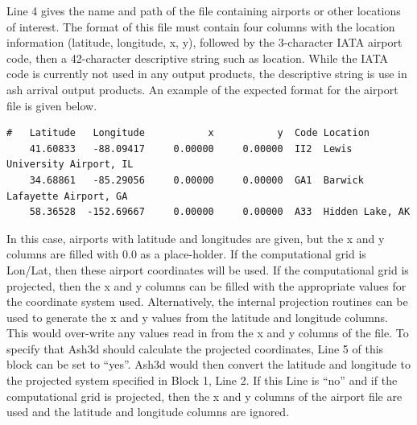 Line 4 gives the name and path of the file containing airports or other locations
of interest. The format of this file must contain four columns with the location
information (latitude, longitude, x, y), followed by the 3-character IATA airport
code, then a 42-character descriptive string such as location. While the IATA
code is currently not used in any output products, the descriptive
string is use in ash arrival output products. An example of the expected format
for the airport file is given below.
\small
\begin{verbatim}
#   Latitude   Longitude           x           y  Code Location
    41.60833   -88.09417     0.00000     0.00000  II2  Lewis University Airport, IL
    34.68861   -85.29056     0.00000     0.00000  GA1  Barwick Lafayette Airport, GA
    58.36528  -152.69667     0.00000     0.00000  A33  Hidden Lake, AK
\end{verbatim}
\normalsize
In this case, airports with latitude and longitudes are given, but the x and y
columns are filled with 0.0 as a place-holder. If the computational grid is
Lon/Lat, then these airport coordinates will be used. If the computational 
grid is projected, then the x and y columns can be filled with the appropriate
values for the coordinate system used. Alternatively, the internal projection routines
can be used to generate the x and y values from the latitude and longitude columns.
This would over-write any values read in from the x and y columns of the file.
To specify that Ash3d should calculate the projected coordinates, Line 5 of
this block can be set to ``yes''. Ash3d would then convert the latitude and longitude
to the projected system specified in Block 1, Line 2. If this Line is ``no'' and 
if the computational grid is projected, then the x and y columns of the airport
file are used and the latitude and longitude columns are ignored.

